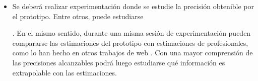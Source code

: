 \begin{itemize}
    \item
      Se deberá realizar experimentación donde se estudie la precisión
      obtenible por el prototipo.
      Entre otros, puede estudiarse .
      En el mismo sentido, durante una misma sesión de experimentación pueden
      compararse las estimaciones del prototipo con estimaciones de
      \eyetrackers profesionales, como lo han hecho en otros trabajos de
      \eyetracking web \cite{xu_2015_turker_gaze, huang_2016_pace}.
      Con una mayor comprensión de las precisiones alcanzables podrá luego
      estudiarse qué información es extrapolable con las estimaciones.
  

\end{itemize}

